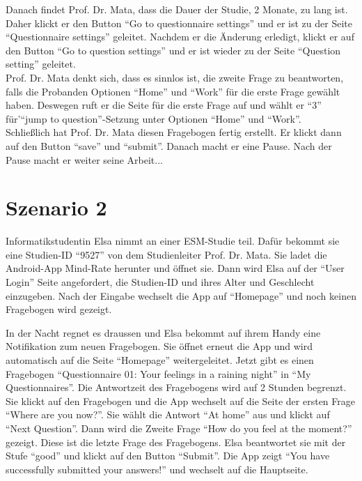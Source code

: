 \documentclass[a4paper]{scrreprt}
\begin{document}
                Danach findet Prof. Dr. Mata, dass die Dauer der Studie, 2 Monate,  zu lang ist. Daher klickt er den Button ``Go to questionnaire settings'' und er ist zu der Seite ``Questionnaire settings'' geleitet. Nachdem er die \"Anderung erledigt, klickt er auf den Button ``Go to question settings'' und er ist wieder zu der Seite ``Question setting'' geleitet. \\
                Prof. Dr. Mata denkt sich, dass es sinnlos ist, die zweite Frage zu beantworten, falls die Probanden Optionen ``Home'' und ``Work'' f\"ur die erste Frage gew\"ahlt haben. Deswegen ruft er die Seite f\"ur die erste Frage auf und w\"ahlt er ``3'' f\"ur'``jump to question''-Setzung unter Optionen ``Home'' und ``Work''. \\
                Schließlich hat Prof. Dr. Mata diesen Fragebogen fertig erstellt. Er klickt dann auf den Button ``save'' und ``submit''. Danach macht er eine Pause. Nach der Pause macht er weiter seine Arbeit...\\

            \section{Szenario 2}
	            \par Informatikstudentin Elsa nimmt an einer ESM-Studie teil. Dafür bekommt sie eine Studien-ID ``9527'' von dem Studienleiter Prof. Dr. Mata. Sie ladet die Android-App Mind-Rate herunter und \"offnet sie. Dann wird Elsa auf der ``User Login'' Seite angefordert, die Studien-ID und ihres Alter und Geschlecht einzugeben. Nach der Eingabe wechselt die App auf ``Homepage'' und noch keinen Fragebogen wird gezeigt.

	            \par In der Nacht regnet es draussen und Elsa bekommt auf ihrem Handy eine Notifikation zum neuen Fragebogen. Sie \"offnet erneut die App und wird automatisch auf die Seite ``Homepage'' weitergeleitet. Jetzt gibt es einen Fragebogen ``Questionnaire 01: Your feelings in a raining night'' in ``My Questionnaires''. Die Antwortzeit des Fragebogens wird auf 2 Stunden begrenzt. Sie klickt auf den Fragebogen und die App wechselt auf die Seite der ersten Frage ``Where are you now?''. Sie w\"ahlt die Antwort ``At home'' aus und klickt auf ``Next Question''. Dann wird die Zweite Frage ``How do you feel at the moment?'' gezeigt. Diese ist die letzte Frage des Fragebogens. Elsa beantwortet sie mit der Stufe ``good'' und klickt auf den Button ``Submit''. Die App zeigt “You have successfully submitted your answers!” und wechselt auf die Hauptseite.
\end{document}
